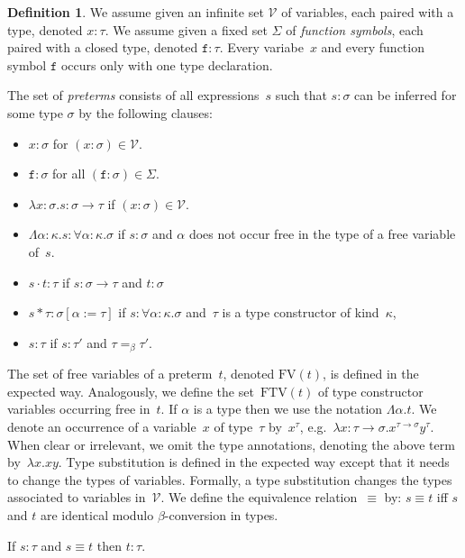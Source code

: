 \documentclass[a4paper,UKenglish,cleveref,autoref,numberwithinsect]{lipics-v2019}
\theoremstyle{definition}
\newtheorem{defn}[theorem]{Definition}
\newcommand{\Vars}{\mathcal{V}}
\newcommand{\arrtype}{\rightarrow}
\newcommand{\quant}[2]{\forall #1.#2}
\newcommand{\app}[2]{#1 \cdot #2}
\newcommand{\tapp}[2]{#1 * #2}
\newcommand{\subst}[2]{#1:=#2}
\newcommand{\abs}[2]{\lambda #1.#2}
\newcommand{\tabs}[2]{\Lambda #1.#2}
\newcommand{\FTV}{\mathrm{FTV}}
\newcommand{\FV}{\mathrm{FV}}
\begin{document}
\begin{defn}\label{def_preterms}
  We assume given an infinite set $\Vars$ of variables, each paired
  with a type, denoted $x : \tau$. We assume given a fixed set
  $\Sigma$ of \emph{function symbols}, each paired with a closed type,
  denoted $\mathtt{f} : \tau$. Every variabe~$x$ and every function
  symbol $\mathtt{f}$ occurs only with one type declaration.

  The set of \emph{preterms} consists of all expressions~$s$ such that
  $s : \sigma$ can be inferred for some type $\sigma$ by the following
  clauses:
  \begin{itemize}
  \item $x : \sigma$ for $(x : \sigma) \in \Vars$.
  \item $\mathtt{f} : \sigma$ for all
    $(\mathtt{f} : \sigma) \in \Sigma$.
  \item $\abs{x:\sigma}{s} : \sigma \arrtype \tau$ if
    $(x : \sigma) \in \Vars$.
  \item $\tabs{\alpha:\kappa}{s} : \quant{\alpha:\kappa}{\sigma}$ if
    $s : \sigma$ and $\alpha$ does not occur free in the type of a
    free variable of~$s$.
  \item $\app{s}{t} : \tau$ if $s : \sigma \arrtype \tau$ and
    $t : \sigma$
  \item $\tapp{s}{\tau} : \sigma[\subst{\alpha}{\tau}]$ if
    $s : \quant{\alpha:\kappa}{\sigma}$ and~$\tau$ is a type
    constructor of kind~$\kappa$,
  \item $s : \tau$ if $s : \tau'$ and $\tau =_\beta \tau'$.
  \end{itemize}
  The set of free variables of a preterm~$t$, denoted $\FV(t)$, is
  defined in the expected way. Analogously, we define the
  set~$\FTV(t)$ of type constructor variables occurring free in~$t$.
  If $\alpha$ is a type then we use the notation $\tabs{\alpha}{t}$.
  We denote an occurrence of a variable~$x$ of type~$\tau$
  by~$x^\tau$,
  e.g.~$\lambda x : \tau\arrtype\sigma
  . x^{\tau\arrtype\sigma}y^\tau$. When clear or irrelevant, we omit
  the type annotations, denoting the above term by~$\lambda x . x
  y$. Type substitution is defined in the expected way except that it
  needs to change the types of variables. Formally, a type
  substitution changes the types associated to variables in~$\Vars$. We
  define the equivalence relation~$\equiv$ by: $s \equiv t$ iff $s$
  and $t$ are identical modulo $\beta$-conversion in types.
\end{defn}

\begin{lemma}
  If $s : \tau$ and $s \equiv t$ then $t : \tau$.
\end{lemma}
\end{document}
